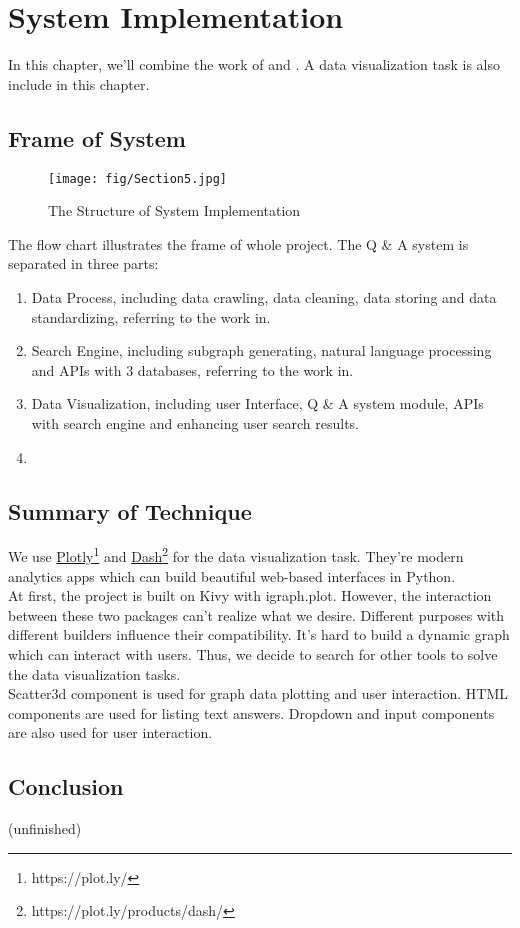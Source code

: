 \chapter{System Implementation}
\label{Ch-5:Sec:System}

In this chapter, we'll combine the work of  and . A data visualization task is also include in this chapter. 

\section{Frame of System}

\begin{figure}
	\centering
	\texttt{[image: fig/Section5.jpg]}
	\caption{The Structure of System Implementation}
	\label{fig:section5-pic1}
\end{figure}

The flow chart  illustrates the frame of whole project. The Q \& A system is separated in three parts:
\begin{enumerate}
	\item Data Process, including data crawling, data cleaning, data storing and data standardizing, referring to the work in.
	\item Search Engine, including subgraph generating, natural language processing and APIs with 3 databases, referring to the work in.
	\item Data Visualization, including user Interface, Q \& A system module, APIs with search engine and enhancing user search results.
	\item 
\end{enumerate}

\section{Summary of Technique}

We use \href{https://plot.ly/}{Plotly}\footnote{https://plot.ly/} and \href{https://plot.ly/products/dash/}{Dash}\footnote{https://plot.ly/products/dash/} for the data visualization task. They're modern analytics apps which can build beautiful web-based interfaces in Python. \\
At first, the project is built on Kivy with igraph.plot. However, the interaction between these two packages can't realize what we desire. Different purposes with different builders influence their compatibility. It's hard to build a dynamic graph which can interact with users. Thus, we decide to search for other tools to solve the data visualization tasks.\\
Scatter3d component is used for graph data plotting and user interaction. HTML components are used for listing text answers. Dropdown and input components are also used for user interaction.

\section{Conclusion}
(unfinished)